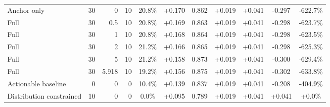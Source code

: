 \begin{table}[htbp]
\begin{tabular}{lrrrccccccc}
Anchor only & 30 & 0 & 10 & 20.8\% & +0.170 & 0.862 & +0.019 & +0.041 & -0.297 & -622.7\% \\
Full & 30 & 0.5 & 10 & 20.8\% & +0.169 & 0.863 & +0.019 & +0.041 & -0.298 & -623.7\% \\
Full & 30 & 1 & 10 & 20.8\% & +0.168 & 0.864 & +0.019 & +0.041 & -0.298 & -623.5\% \\
Full & 30 & 2 & 10 & 21.2\% & +0.166 & 0.865 & +0.019 & +0.041 & -0.298 & -625.3\% \\
Full & 30 & 5 & 10 & 21.2\% & +0.158 & 0.873 & +0.019 & +0.041 & -0.300 & -629.4\% \\
Full & 30 & 5.918 & 10 & 19.2\% & +0.156 & 0.875 & +0.019 & +0.041 & -0.302 & -633.8\% \\
Actionable baseline & 0 & 0 & 0 & 10.4\% & +0.139 & 0.837 & +0.019 & +0.041 & -0.208 & -404.9\% \\
Distribution constrained & 10 & 0 & 0 & 0.0\% & +0.095 & 0.789 & +0.019 & +0.041 & +0.041 & +0.0\% \\
\bottomrule
\end{tabular}
\end{table}